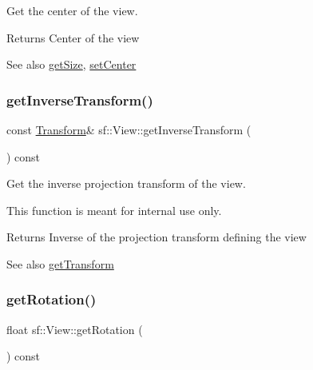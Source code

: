 Get the center of the view. 

\begin{DoxyReturn}{Returns}
Center of the view
\end{DoxyReturn}
\begin{DoxySeeAlso}{See also}
\mbox{\hyperlink{classsf_1_1_view_a5432748dd3a78ac4019dfbde208c7cc1}{get\+Size}}, \mbox{\hyperlink{classsf_1_1_view_aa8e3fedb008306ff9811163545fb75f2}{set\+Center}} \begin{DoxyVerb}\end{DoxyVerb}
 
\end{DoxySeeAlso}
\mbox{\label{classsf_1_1_view_acd2b001cf2a646f62e7d9e792d7d5f0d}} 
\subsubsection{\texorpdfstring{getInverseTransform()}{getInverseTransform()}}
{\footnotesize\ttfamily const \mbox{\hyperlink{classsf_1_1_transform}{Transform}}\& sf\+::\+View\+::get\+Inverse\+Transform (\begin{DoxyParamCaption}{ }\end{DoxyParamCaption}) const}



Get the inverse projection transform of the view. 

This function is meant for internal use only.

\begin{DoxyReturn}{Returns}
Inverse of the projection transform defining the view
\end{DoxyReturn}
\begin{DoxySeeAlso}{See also}
\mbox{\hyperlink{classsf_1_1_view_a13da786526688bf99dc2cd3e658a3c2a}{get\+Transform}} \begin{DoxyVerb}\end{DoxyVerb}
 
\end{DoxySeeAlso}
\mbox{\label{classsf_1_1_view_a324d8885f4ab17f1f7b0313580c9b84e}} 
\subsubsection{\texorpdfstring{getRotation()}{getRotation()}}
{\footnotesize\ttfamily float sf\+::\+View\+::get\+Rotation (\begin{DoxyParamCaption}{ }\end{DoxyParamCaption}) const}



